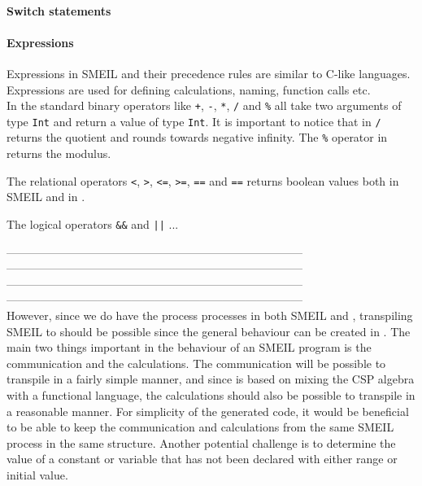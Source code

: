\paragraph{Switch statements}

\paragraph{Expressions}
Expressions in SMEIL and their precedence rules are similar to C-like languages. Expressions are used for defining calculations, naming, function calls etc.\\
In \cspm the standard binary operators like \texttt{+}, \texttt{-}, \texttt{*}, \texttt{/} and \texttt{\%} all take two arguments of type \texttt{Int} and return a value of type \texttt{Int}. It is important to notice that in \cspm \texttt{/} returns the quotient and rounds towards negative infinity. The \texttt{\%} operator in \cspm returns the modulus.

The relational operators \texttt{<}, \texttt{>}, \texttt{<=}, \texttt{>=}, \texttt{==} and \texttt{==} returns boolean values both in SMEIL and in \cspm.

The logical operators \texttt{\&\&} and \texttt{||} ... %




------------------------------------------------------------------------------\\
------------------------------------------------------------------------------\\
------------------------------------------------------------------------------\\
------------------------------------------------------------------------------\\


However, since we do have the process processes in both SMEIL and \cspm, transpiling SMEIL to \cspm should be possible since the general behaviour can be created in \cspm. The main two things important in the behaviour of an SMEIL program is the communication and the calculations. The communication will be possible to transpile in a fairly simple manner, and since \cspm is based on mixing the CSP algebra with a functional language, the calculations should also be possible to transpile in a reasonable manner.
For simplicity of the generated code, it would be beneficial to be able to keep the communication and calculations from the same SMEIL process in the same \cspm structure. Another potential challenge is to determine the value of a constant or variable that has not been declared with either range or initial value.



